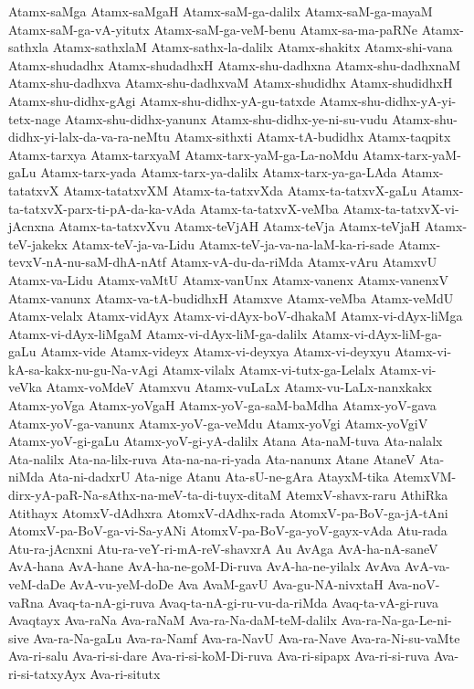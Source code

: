 {Atamx-saMga
Atamx-saMgaH
Atamx-saM-ga-dalilx
Atamx-saM-ga-mayaM
Atamx-saM-ga-vA-yitutx
Atamx-saM-ga-veM-benu
Atamx-sa-ma-paRNe
Atamx-sathxla
Atamx-sathxlaM
Atamx-sathx-la-dalilx
Atamx-shakitx
Atamx-shi-vana
Atamx-shudadhx
Atamx-shudadhxH
Atamx-shu-dadhxna
Atamx-shu-dadhxnaM
Atamx-shu-dadhxva
Atamx-shu-dadhxvaM
Atamx-shudidhx
Atamx-shudidhxH
Atamx-shu-didhx-gAgi
Atamx-shu-didhx-yA-gu-tatxde
Atamx-shu-didhx-yA-yi-tetx-nage
Atamx-shu-didhx-yanunx
Atamx-shu-didhx-ye-ni-su-vudu
Atamx-shu-didhx-yi-lalx-da-va-ra-neMtu
Atamx-sithxti
Atamx-tA-budidhx
Atamx-taqpitx
Atamx-tarxya
Atamx-tarxyaM
Atamx-tarx-yaM-ga-La-noMdu
Atamx-tarx-yaM-gaLu
Atamx-tarx-yada
Atamx-tarx-ya-dalilx
Atamx-tarx-ya-ga-LAda
Atamx-tatatxvX
Atamx-tatatxvXM
Atamx-ta-tatxvXda
Atamx-ta-tatxvX-gaLu
Atamx-ta-tatxvX-parx-ti-pA-da-ka-vAda
Atamx-ta-tatxvX-veMba
Atamx-ta-tatxvX-vi-jAcnxna
Atamx-ta-tatxvXvu
Atamx-teVjAH
Atamx-teVja
Atamx-teVjaH
Atamx-teV-jakekx
Atamx-teV-ja-va-Lidu
Atamx-teV-ja-va-na-laM-ka-ri-sade
Atamx-tevxV-nA-nu-saM-dhA-nAtf
Atamx-vA-du-da-riMda
Atamx-vAru
AtamxvU
Atamx-va-Lidu
Atamx-vaMtU
Atamx-vanUnx
Atamx-vanenx
Atamx-vanenxV
Atamx-vanunx
Atamx-va-tA-budidhxH
Atamxve
Atamx-veMba
Atamx-veMdU
Atamx-velalx
Atamx-vidAyx
Atamx-vi-dAyx-boV-dhakaM
Atamx-vi-dAyx-liMga
Atamx-vi-dAyx-liMgaM
Atamx-vi-dAyx-liM-ga-dalilx
Atamx-vi-dAyx-liM-ga-gaLu
Atamx-vide
Atamx-videyx
Atamx-vi-deyxya
Atamx-vi-deyxyu
Atamx-vi-kA-sa-kakx-nu-gu-Na-vAgi
Atamx-vilalx
Atamx-vi-tutx-ga-Lelalx
Atamx-vi-veVka
Atamx-voMdeV
Atamxvu
Atamx-vuLaLx
Atamx-vu-LaLx-nanxkakx
Atamx-yoVga
Atamx-yoVgaH
Atamx-yoV-ga-saM-baMdha
Atamx-yoV-gava
Atamx-yoV-ga-vanunx
Atamx-yoV-ga-veMdu
Atamx-yoVgi
Atamx-yoVgiV
Atamx-yoV-gi-gaLu
Atamx-yoV-gi-yA-dalilx
Atana
Ata-naM-tuva
Ata-nalalx
Ata-nalilx
Ata-na-lilx-ruva
Ata-na-na-ri-yada
Ata-nanunx
Atane
AtaneV
Ata-niMda
Ata-ni-dadxrU
Ata-nige
Atanu
Ata-sU-ne-gAra
AtayxM-tika
AtemxVM-dirx-yA-paR-Na-sAthx-na-meV-ta-di-tuyx-ditaM
AtemxV-shavx-raru
AthiRka
Atithayx
AtomxV-dAdhxra
AtomxV-dAdhx-rada
AtomxV-pa-BoV-ga-jA-tAni
AtomxV-pa-BoV-ga-vi-Sa-yANi
AtomxV-pa-BoV-ga-yoV-gayx-vAda
Atu-rada
Atu-ra-jAcnxni
Atu-ra-veY-ri-mA-reV-shavxrA
Au
AvAga
AvA-ha-nA-saneV
AvA-hana
AvA-hane
AvA-ha-ne-goM-Di-ruva
AvA-ha-ne-yilalx
AvAva
AvA-va-veM-daDe
AvA-vu-yeM-doDe
Ava
AvaM-gavU
Ava-gu-NA-nivxtaH
Ava-noV-vaRna
Avaq-ta-nA-gi-ruva
Avaq-ta-nA-gi-ru-vu-da-riMda
Avaq-ta-vA-gi-ruva
Avaqtayx
Ava-raNa
Ava-raNaM
Ava-ra-Na-daM-teM-dalilx
Ava-ra-Na-ga-Le-ni-sive
Ava-ra-Na-gaLu
Ava-ra-Namf
Ava-ra-NavU
Ava-ra-Nave
Ava-ra-Ni-su-vaMte
Ava-ri-salu
Ava-ri-si-dare
Ava-ri-si-koM-Di-ruva
Ava-ri-sipapx
Ava-ri-si-ruva
Ava-ri-si-tatxyAyx
Ava-ri-situtx
}
